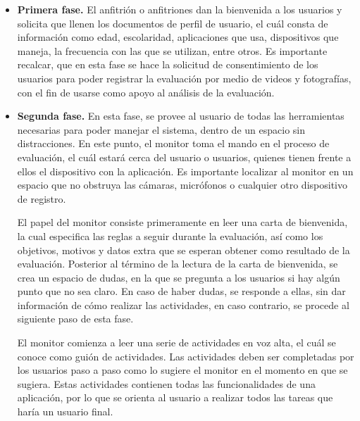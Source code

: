 \begin{itemize}
  \item \textbf{Primera fase.} El anfitrión o anfitriones dan la bienvenida a los usuarios y solicita que llenen los documentos de perfil de usuario, el cuál consta de información como edad, escolaridad, aplicaciones que usa, dispositivos que maneja, la frecuencia con las que se utilizan, entre otros. Es importante recalcar, que en esta fase se hace la solicitud de consentimiento de los usuarios para poder registrar la evaluación por medio de videos y fotografías, con el fin de usarse como apoyo al análisis de la evaluación.
  \item \textbf{Segunda fase.} En esta fase, se provee al usuario de todas las herramientas necesarias para poder manejar el sistema, dentro de un espacio sin distracciones. En este punto, el monitor toma el mando en el proceso de evaluación, el cuál estará cerca del usuario o usuarios, quienes tienen frente a ellos el dispositivo con la aplicación. Es importante localizar al monitor en un espacio que no obstruya las cámaras, micrófonos o cualquier otro dispositivo de registro.
  
  El papel del monitor consiste primeramente en leer una carta de bienvenida, la cual especifica las reglas a seguir durante la evaluación, así como los objetivos, motivos y datos extra que se esperan obtener como resultado de la evaluación. Posterior al término de la lectura de la carta de bienvenida, se crea un espacio de dudas, en la que se pregunta a los usuarios si hay algún punto que no sea claro. En caso de haber dudas, se responde a ellas, sin dar información de cómo realizar las actividades, en caso contrario, se procede al siguiente paso de esta fase.
  
  El monitor comienza a leer una serie de actividades en voz alta, el cuál se conoce como guión de actividades. Las actividades deben ser completadas por los usuarios paso a paso como lo sugiere el monitor en el momento en que se sugiera. Estas actividades contienen todas las funcionalidades de una aplicación, por lo que se orienta al usuario a realizar todos las tareas que haría un usuario final.
  

\end{itemize}
